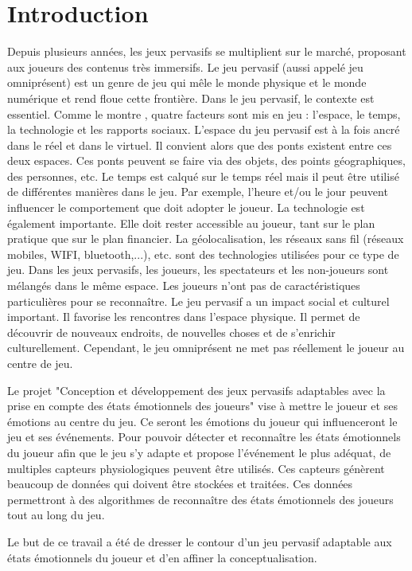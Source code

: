 \documentclass[11pt]{article}
\begin{document}
\section{Introduction}
	Depuis plusieurs années, les jeux pervasifs se multiplient sur le marché, proposant aux joueurs des contenus très immersifs.
	Le jeu pervasif (aussi appelé jeu omniprésent) est un genre de jeu qui mêle le monde physique et le monde numérique et rend floue cette frontière.
	Dans le jeu pervasif, le contexte est essentiel.
	Comme le montre \cite{astic_2013}, quatre facteurs sont mis en jeu : l'espace, le temps, la technologie et les rapports sociaux.
	L'espace du jeu pervasif est à la fois ancré dans le réel et dans le virtuel.
	Il convient alors que des ponts existent entre ces deux espaces.
	Ces ponts peuvent se faire via des objets, des points géographiques, des personnes, etc.
	Le temps est calqué sur le temps réel mais il peut être utilisé de différentes manières dans le jeu.
	Par exemple, l'heure et/ou le jour peuvent influencer le comportement que doit adopter le joueur.
	La technologie est également importante.
	Elle doit rester accessible au joueur, tant sur le plan pratique que sur le plan financier.
	La géolocalisation, les réseaux sans fil (réseaux mobiles, WIFI, bluetooth,...), etc. sont des technologies utilisées pour ce type de jeu.
	Dans les jeux pervasifs, les joueurs, les spectateurs et les non-joueurs sont mélangés dans le même espace.
	Les joueurs n'ont pas de caractéristiques particulières pour se reconnaître.
	Le jeu pervasif a un impact social et culturel important.
	Il favorise les rencontres dans l'espace physique.
	Il permet de découvrir de nouveaux endroits, de nouvelles choses et de s'enrichir culturellement.
	Cependant, le jeu omniprésent ne met pas réellement le joueur au centre de jeu.\par
	Le projet "Conception et développement des jeux pervasifs adaptables avec la prise en compte des états émotionnels des joueurs" vise à mettre le joueur et ses émotions au centre du jeu.
	Ce seront les émotions du joueur qui influenceront le jeu et ses événements.
	Pour pouvoir détecter et reconnaître les états émotionnels du joueur afin que le jeu s'y adapte et propose l'événement le plus adéquat, de multiples capteurs physiologiques peuvent être utilisés.
	Ces capteurs génèrent beaucoup de données qui doivent être stockées et traitées.
	Ces données permettront à des algorithmes de reconnaître des états émotionnels des joueurs tout au long du jeu.\par
	Le but de ce travail a été de dresser le contour d'un jeu pervasif adaptable aux états émotionnels du joueur et d'en affiner la conceptualisation.
\end{document}
